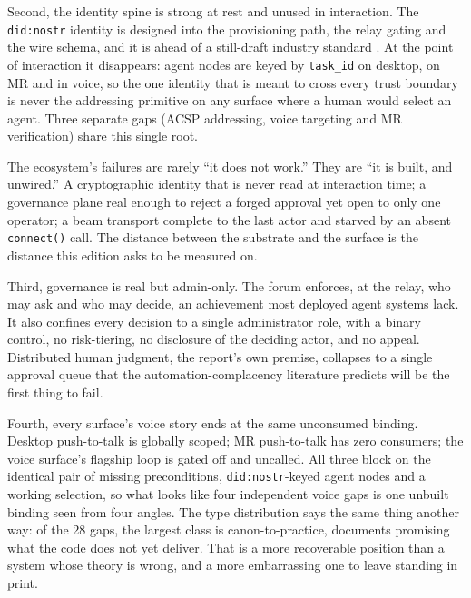 Second, the identity spine is strong at rest and unused in interaction. The \texttt{did:nostr} identity is designed into the provisioning path, the relay gating and the wire schema, and it is ahead of a still-draft industry standard \parencite{AIIdentity2026}. At the point of interaction it disappears: agent nodes are keyed by \texttt{task\_id} on desktop, on MR and in voice, so the one identity that is meant to cross every trust boundary is never the addressing primitive on any surface where a human would select an agent. Three separate gaps (ACSP addressing, voice targeting and MR verification) share this single root.

\begin{keyinsight}[title={The register's through line}]
The ecosystem's failures are rarely ``it does not work.'' They are ``it is built, and unwired.'' A cryptographic identity that is never read at interaction time; a governance plane real enough to reject a forged approval yet open to only one operator; a beam transport complete to the last actor and starved by an absent \texttt{connect()} call. The distance between the substrate and the surface is the distance this edition asks to be measured on.
\end{keyinsight}

Third, governance is real but admin-only. The forum enforces, at the relay, who may ask and who may decide, an achievement most deployed agent systems lack. It also confines every decision to a single administrator role, with a binary control, no risk-tiering, no disclosure of the deciding actor, and no appeal. Distributed human judgment, the report's own premise, collapses to a single approval queue that the automation-complacency literature predicts will be the first thing to fail.

Fourth, every surface's voice story ends at the same unconsumed binding. Desktop push-to-talk is globally scoped; MR push-to-talk has zero consumers; the voice surface's flagship loop is gated off and uncalled. All three block on the identical pair of missing preconditions, \texttt{did:nostr}-keyed agent nodes and a working selection, so what looks like four independent voice gaps is one unbuilt binding seen from four angles. The type distribution says the same thing another way: of the 28 gaps, the largest class is canon-to-practice, documents promising what the code does not yet deliver. That is a more recoverable position than a system whose theory is wrong, and a more embarrassing one to leave standing in print.

